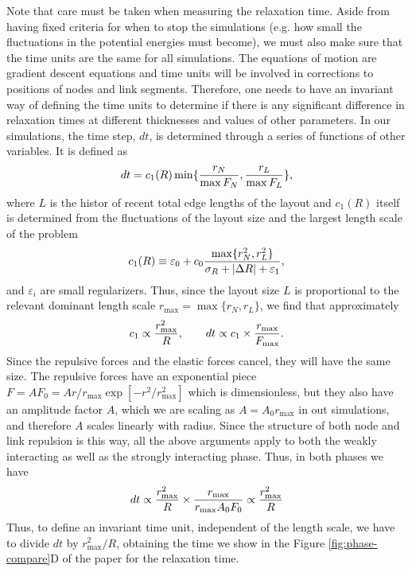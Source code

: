 \documentclass[linenumbers,endfloats,nofootinbib,preprint,floatfix,titlepage,superscriptaddress]{revtex4-1} %
\begin{document}
Note that care must be taken when measuring the relaxation time. 
Aside from having fixed criteria for when to stop the simulations (e.g. how small the fluctuations in the potential energies must become), we must also make sure that the time units are the same for all simulations. 
The equations of motion are gradient descent equations and time units will be involved in corrections to positions of nodes and link segments. 
Therefore, one needs to have an invariant way of defining the time units to determine if there is any significant difference in relaxation times at different thicknesses and values of other parameters. 
In our simulations, the time step, $dt$, is determined through a series of functions of other variables. 
It is defined as 
$$dt = c_1( R) \min\{{r_N\over \max{F_N}},{r_L\over \max{F_L}}\}, $$
where $L$ is the histor of recent total edge lengths of the layout and  $c_1(R)$ itself is determined from the fluctuations of the layout size and the largest length scale of the problem
$$ c_1(R) \equiv \varepsilon_0 + c_0 {\max\{r_N^2, r_L^2\}\over \sigma_R + |\Delta R|+\varepsilon_1},$$
and $\varepsilon_i$ are small regularizers. 
Thus, since the layout size $L$ is proportional to the relevant dominant length scale $r_{\max} = \max{\{r_N, r_L\}} $, we find that approximately
\[ c_1 \propto {r_{\max}^2\over R}, \qquad dt \propto c_1 \times {r_{\max} \over F_{\max}}. \]
Since the repulsive forces and the elastic forces cancel, they will have the same size. The repulsive forces have an exponential piece $ F = A F_0 = A r/r_{\max} \exp[-r^2/r^2_{\max}] $ which is dimensionless, but they also have an amplitude factor $A$, which we are scaling as $A = A_0 r_{\max}$ in out simulations, and therefore $A$ scales linearly with radius. 
Since the structure of both node and link repulsion is this way, all the above arguments apply to both the weakly interacting as well as the strongly interacting phase. %
Thus, in both phases we have
$$ dt \propto {r_{\max}^2\over R} \times {r_{\max} \over r_{\max} A_0 F_0 } \propto {r_{\max}^2\over R} $$
Thus, to define an invariant time unit, independent of the length scale, we have to divide $dt$ by $r_{\max}^2/ R$, obtaining the time we show in the Figure \ref{fig:phase-compare}D of the paper for the relaxation time. 
\end{document}
